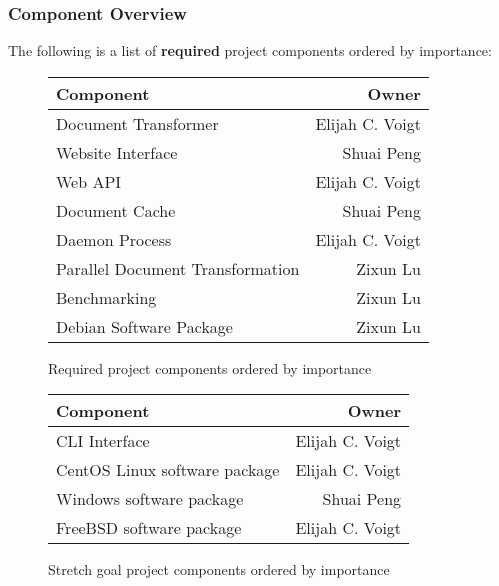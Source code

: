 \subsubsection{Component Overview}
\label{component-overview}

The following is a list of \textbf{required} project components ordered by importance:

\begin{figure}
\begin{center}
    \begin{tabular}{ | l | r | }
    \hline
      Component & Owner \\ \hline
      Document Transformer & Elijah C. Voigt \\ \hline
      Website Interface & Shuai Peng \\ \hline
      Web API & Elijah C. Voigt \\ \hline
      Document Cache & Shuai Peng \\ \hline
      Daemon Process & Elijah C. Voigt \\ \hline
      Parallel Document Transformation & Zixun Lu \\ \hline
      Benchmarking & Zixun Lu \\ \hline
      Debian Software Package & Zixun Lu \\ \hline
    \end{tabular}
\end{center}
\caption{Required project components ordered by importance}
\end{figure}

\begin{figure}
\begin{center}
    \begin{tabular}{ | l | r | }
    \hline
      Component & Owner \\ \hline
      CLI Interface & Elijah C. Voigt \\ \hline
      CentOS Linux software package & Elijah C. Voigt \\ \hline
      Windows software package & Shuai Peng \\ \hline
      FreeBSD software package & Elijah C. Voigt  \\ \hline
    \end{tabular}
\end{center}
\caption{Stretch goal project components ordered by importance}
\end{figure}

